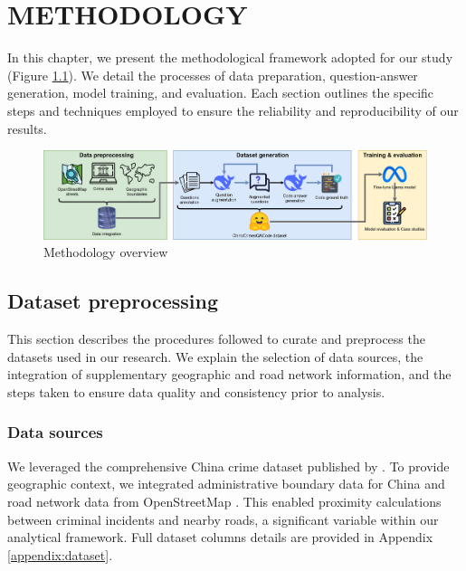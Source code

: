 \chapter{ METHODOLOGY}

\noindent
In this chapter, we present the methodological framework adopted for our study (Figure \ref{fig:methodology_overview}). We detail the processes of data preparation, question-answer generation, model training, and evaluation. Each section outlines the specific steps and techniques employed to ensure the reliability and reproducibility of our results.


\begin{figure}[hbtp]
  \centering
  \includegraphics[width=\textwidth]{images/metodologia.png}
  \caption{Methodology overview}
  \label{fig:methodology_overview}
\end{figure}


\section{Dataset preprocessing}

\noindent
This section describes the procedures followed to curate and preprocess the datasets used in our research. We explain the selection of data sources, the integration of supplementary geographic and road network information, and the steps taken to ensure data quality and consistency prior to analysis.

\subsection{Data sources}

We leveraged the comprehensive China crime dataset published by \cite{Zhang2025CrimeDatasetChina}. To provide geographic context, we integrated administrative boundary data for China \citep{GeoJSON2025China} and road network data from OpenStreetMap \citep{Vargas2021OSM}. This enabled proximity calculations between criminal incidents and nearby roads, a significant variable within our analytical framework. Full dataset columns details are provided in Appendix \ref{appendix:dataset}.

